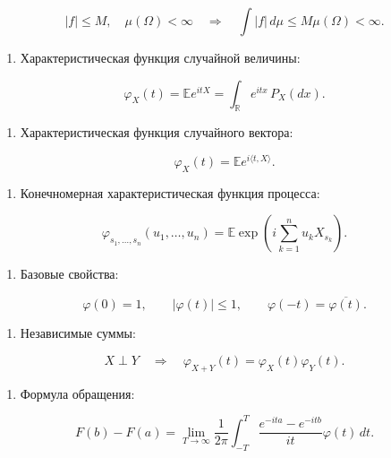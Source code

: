 \documentclass[
  11pt,
  a4paper,
]{article}
\providecommand{\tightlist}{%
  \setlength{\itemsep}{0pt}\setlength{\parskip}{0pt}}
\begin{document}
\[
|f|\le M,\quad \mu(\Omega)<\infty
\quad\Rightarrow\quad
\int |f|\,d\mu\le M\mu(\Omega)<\infty.
\]

\begin{enumerate}
\def\labelenumi{\arabic{enumi}.}
\setcounter{enumi}{1}
\tightlist
\item
  Характеристическая функция случайной величины:
\end{enumerate}

\[
\varphi_X(t)=\mathbb E e^{itX}
=\int_{\mathbb R} e^{itx}\,P_X(dx).
\]

\begin{enumerate}
\def\labelenumi{\arabic{enumi}.}
\setcounter{enumi}{2}
\tightlist
\item
  Характеристическая функция случайного вектора:
\end{enumerate}

\[
\varphi_X(t)=\mathbb E e^{i\langle t,X\rangle}.
\]

\begin{enumerate}
\def\labelenumi{\arabic{enumi}.}
\setcounter{enumi}{3}
\tightlist
\item
  Конечномерная характеристическая функция процесса:
\end{enumerate}

\[
\varphi_{s_1,\ldots,s_n}(u_1,\ldots,u_n)
=
\mathbb E\exp\left(i\sum_{k=1}^n u_kX_{s_k}\right).
\]

\begin{enumerate}
\def\labelenumi{\arabic{enumi}.}
\setcounter{enumi}{4}
\tightlist
\item
  Базовые свойства:
\end{enumerate}

\[
\varphi(0)=1,\qquad |\varphi(t)|\le1,\qquad
\varphi(-t)=\overline{\varphi(t)}.
\]

\begin{enumerate}
\def\labelenumi{\arabic{enumi}.}
\setcounter{enumi}{5}
\tightlist
\item
  Независимые суммы:
\end{enumerate}

\[
X\perp Y
\quad\Rightarrow\quad
\varphi_{X+Y}(t)=\varphi_X(t)\varphi_Y(t).
\]

\begin{enumerate}
\def\labelenumi{\arabic{enumi}.}
\setcounter{enumi}{6}
\tightlist
\item
  Формула обращения:
\end{enumerate}

\[
F(b)-F(a)
=
\lim_{T\to\infty}
\frac1{2\pi}
\int_{-T}^{T}
\frac{e^{-ita}-e^{-itb}}{it}\varphi(t)\,dt.
\]
\end{document}
